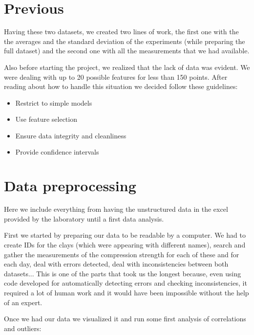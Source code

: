 \documentclass[10pt,conference,compsocconf]{IEEEtran}
\begin{document}
\section{Previous}


Having these two datasets, we created two lines of work, the first one with the the averages and the standard deviation of the experiments (while preparing the full dataset) and the second one with all the measurements that we had available.

Also before starting the project, we realized that the lack of data was evident. We were dealing with up to 20 possible features for less than 150 points. After reading about how to handle this situation we decided follow these guidelines:
\begin{itemize}
    \item Restrict to simple models
    \item Use feature selection
    \item Ensure data integrity and cleanliness
    \item Provide confidence intervals
\end{itemize}

\section{Data preprocessing}


Here we include everything from having the unstructured data in the excel provided by the laboratory until a first data analysis.

First we started by preparing our data to be readable by a computer. We had to create IDs for the clays (which were appearing with different names), search and gather the measurements of the compression strength for each of these and for each day, deal with errors detected, deal with inconsistencies between both datasets... This is one of the parts that took us the longest because, even using code developed for automatically detecting errors and checking inconsistencies, it required a lot of human work and it would have been impossible without the help of an expert.

Once we had our data we visualized it and run some first analysis of correlations and outliers:
\end{document}
